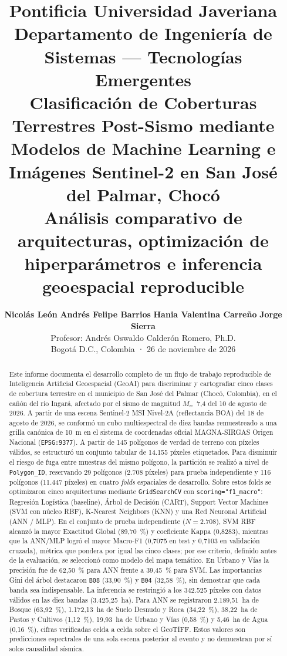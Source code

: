 \documentclass[11pt,a4paper]{article}
\title{\vspace{-1.2cm}
    \textbf{\Large Pontificia Universidad Javeriana}\\[0.2cm]
    \textbf{\large Departamento de Ingeniería de Sistemas — Tecnologías Emergentes}\\[0.6cm]
    \textbf{\LARGE Clasificación de Coberturas Terrestres Post-Sismo mediante Modelos de Machine Learning e Imágenes Sentinel-2 en San José del Palmar, Chocó}\\[0.3cm]
    \large Análisis comparativo de arquitecturas, optimización de hiperparámetros e inferencia geoespacial reproducible
}
\author{
    \textbf{Nicolás León} \quad \textbf{Andrés Felipe Barrios} \quad \textbf{Hania Valentina Carreño} \quad \textbf{Jorge Sierra}\\[0.2cm]
    \normalsize Profesor: Andrés Oswaldo Calderón Romero, Ph.D.\\[0.1cm]
    \small Bogotá D.C., Colombia · 26 de noviembre de 2026
}
\date{}
\newcommand{\estadoauditoriacorto}{cifras verificadas celda a celda sobre el GeoTIFF}
\begin{document}
\maketitle
\vspace{-0.6cm}

\begin{abstract}
\noindent Este informe documenta el desarrollo completo de un flujo de trabajo reproducible de Inteligencia Artificial Geoespacial (GeoAI) para discriminar y cartografiar cinco clases de cobertura terrestre en el municipio de San José del Palmar (Chocó, Colombia), en el cañón del río Ingará, afectado por el sismo de magnitud $M_w$~7,4 del 10 de agosto de 2026. A partir de una escena Sentinel-2 MSI Nivel-2A (reflectancia BOA) del 18 de agosto de 2026, se conformó un cubo multiespectral de diez bandas remuestreado a una grilla canónica de 10~m en el sistema de coordenadas oficial MAGNA-SIRGAS Origen Nacional (\texttt{EPSG:9377}). A partir de 145 polígonos de verdad de terreno con píxeles válidos, se estructuró un conjunto tabular de 14.155 píxeles etiquetados. Para disminuir el riesgo de fuga entre muestras del mismo polígono, la partición se realizó a nivel de \texttt{Polygon\_ID}, reservando 29 polígonos (2.708 píxeles) para prueba independiente y 116 polígonos (11.447 píxeles) en cuatro \textit{folds} espaciales de desarrollo. Sobre estos folds se optimizaron cinco arquitecturas mediante \texttt{GridSearchCV} con \texttt{scoring="f1\_macro"}: Regresión Logística (baseline), Árbol de Decisión (CART), Support Vector Machines (SVM con núcleo RBF), K-Nearest Neighbors (KNN) y una Red Neuronal Artificial (ANN / MLP). En el conjunto de prueba independiente ($N = 2.708$), SVM RBF alcanzó la mayor Exactitud Global (89,70~\%) y coeficiente Kappa (0,8283), mientras que la ANN/MLP logró el mayor Macro-F1 (0,7075 en test y 0,7103 en validación cruzada), métrica que pondera por igual las cinco clases; por ese criterio, definido antes de la evaluación, se seleccionó como modelo del mapa temático. En Urbano y Vías la precisión fue de 62,50~\% para ANN frente a 39,45~\% para SVM. Las importancias Gini del árbol destacaron \texttt{B08} (33,90~\%) y \texttt{B04} (32,58~\%), sin demostrar que cada banda sea indispensable. La inferencia se restringió a los 342.525 píxeles con datos válidos en las diez bandas (3.425,25~ha). Para ANN se registraron 2.189,51~ha de Bosque (63,92~\%), 1.172,13~ha de Suelo Desnudo y Roca (34,22~\%), 38,22~ha de Pastos y Cultivos (1,12~\%), 19,93~ha de Urbano y Vías (0,58~\%) y 5,46~ha de Agua (0,16~\%), \estadoauditoriacorto. Estos valores son predicciones espectrales de una sola escena posterior al evento y no demuestran por sí solos causalidad sísmica.
\end{abstract}
\end{document}
